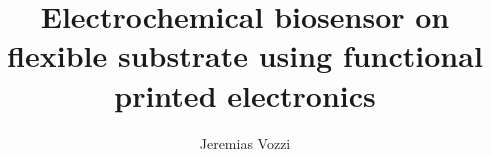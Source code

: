 \documentclass[a4paper,twoside,numbers,spanish]{clases}
\author{Jeremias Vozzi}
\title{Electrochemical biosensor on flexible substrate using functional printed electronics}
\begin{document}
\renewcommand{\chaptername}{Chapter}
\renewcommand{\contentsname}{Table of Contents}
\renewcommand{\listfigurename}{List of Figures}
\renewcommand{\figurename}{Figure}






\tableofcontents
\listoffigures







\appendix
\renewcommand{\appendixname}{Anexo}




\end{document}

